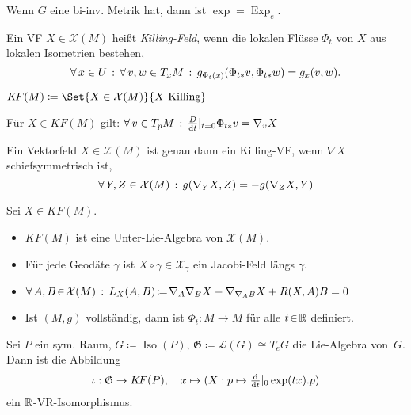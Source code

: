 \documentclass{cheat-sheet}
\DeclareMathOperator{\Exp}{Exp} %
\DeclareMathOperator{\Iso}{Iso} %
\newcommand{\Gie}{\mathfrak{G}} %
\newcommand{\KF}{K\!F} %
\newcommand{\VF}{\mathcal{X}} %
\begin{document}
\begin{bem}
  Wenn $G$ eine bi-inv. Metrik hat, dann ist $\exp = \Exp_e$.
\end{bem}


\begin{defn}
  Ein VF $X \in \VF(M)$ heißt \emph{Killing-Feld}, wenn die lokalen Flüsse $\Phi_t$ von $X$ aus lokalen Isometrien bestehen, \dh{}
  \[
    \forall \, {x \in U} \,:\, \forall \, {v, w \in T_x M} \,:\,
    g_{\Phi_t(x)}(\Phi_{t*} v, \Phi_{t*} w) = g_x(v, w).
  \]
\end{defn}

\begin{nota}
  $\KF(M) \coloneqq \Set{X \in \VF(M)}{X \text{ Killing}}$
\end{nota}

\begin{lem}
  Für $X \in \KF(M)$ gilt:
  $\forall \, {v \in T_p M} \,:\, \tfrac{D}{\mathrm{d} t}|_{t=0} \Phi_{t*} v = \nabla_v X$
\end{lem}

\begin{lem}
  Ein Vektorfeld $X \in \VF(M)$ ist genau dann ein Killing-VF, wenn $\nabla X$ schiefsymmetrisch ist, \dh{}
  \[ \fa{Y, Z \in \VF(M)} g(\nabla_Y X, Z) = - g(\nabla_Z X, Y) \]
\end{lem}

\begin{facts}
  Sei $X \in \KF(M)$.
  \begin{itemize}
    \item $\KF(M)$ ist eine Unter-Lie-Algebra von $\VF(M)$.
    \item Für jede Geodäte $\gamma$ ist $X \circ \gamma \in \VF_\gamma$ ein Jacobi-Feld längs $\gamma$.
    \item $\fa{A, B \!\in\! \VF(M)} L_X(A, B) \!\coloneqq\! \nabla_A \nabla_B X - \nabla_{\nabla_A B} X + R(X, A)B = 0$
    \item Ist $(M, g)$ vollständig, dann ist $\Phi_t : M \!\to\! M$ für alle $t \!\in\! \mathbb{R}$ definiert.
  \end{itemize}
\end{facts}


\begin{satz}
  Sei $P$ ein sym. Raum, $G \coloneqq \Iso(P)$, $\Gie \coloneqq \mathcal{L}(G) \cong T_e G$ die Lie-Algebra von~$G$.
  Dann ist die Abbildung
  \[
    \iota : \Gie \to \KF(P), \quad
    x \mapsto (X : p \mapsto \tfrac{\d}{\d t}|_0 \exp(tx).p)
  \]
  ein $\mathbb{R}$-VR-Isomorphismus.
\end{satz}
\end{document}
